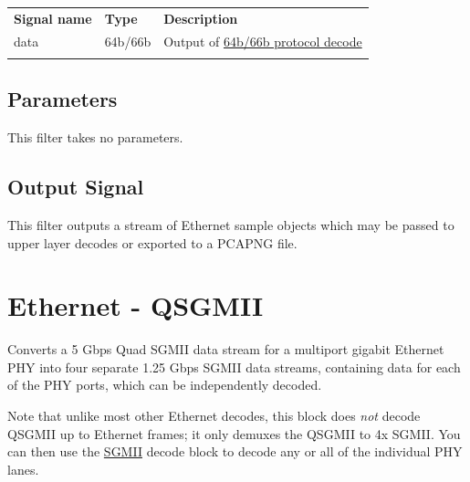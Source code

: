 \FloatBarrier

\begin{tabularx}{16cm}{llX}
\thickhline
\textbf{Signal name} & \textbf{Type} & \textbf{Description} \\
\thickhline
data & 64b/66b & Output of \hyperref[proto:64b66b]{64b/66b protocol decode}\\
\thickhline
\end{tabularx}

\subsection{Parameters}

This filter takes no parameters.

\subsection{Output Signal}

This filter outputs a stream of Ethernet sample objects which may be passed to upper layer decodes or exported to a
PCAPNG file.



\pagebreak
\section{Ethernet - QSGMII}
\label{filter:qsgmii}

Converts a 5 Gbps Quad SGMII data stream for a multiport gigabit Ethernet PHY into four separate 1.25 Gbps SGMII data
streams, containing data for each of the PHY ports, which can be independently decoded.

Note that unlike most other Ethernet decodes, this block does \emph{not} decode QSGMII up to Ethernet frames; it only
demuxes the QSGMII to 4x SGMII. You can then use the \hyperref[filter:sgmii]{SGMII} decode block to decode any or all
of the individual PHY lanes.

